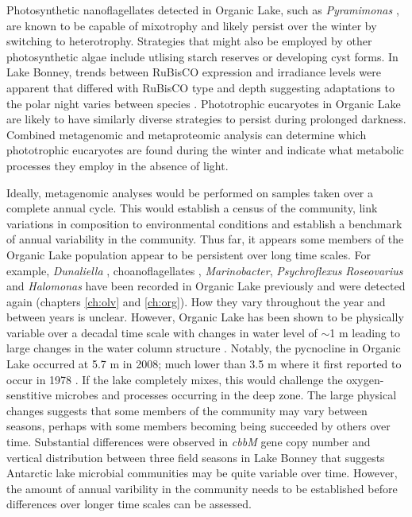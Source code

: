 Photosynthetic nanoflagellates detected in Organic Lake, such as \emph{Pyramimonas} \cite{Bell2003}, are known to be capable of mixotrophy and likely persist over the winter by switching to heterotrophy.
Strategies that might also be employed by other photosynthetic algae include utlising starch reserves or developing cyst forms.
In Lake Bonney, trends between \acs{RuBisCO} expression and irradiance levels were apparent that differed with \acs{RuBisCO} type and depth suggesting adaptations to the polar night varies between species \cite{Kong2012a}.
Phototrophic eucaryotes in Organic Lake are likely to have similarly diverse strategies to persist during prolonged darkness.
Combined metagenomic and metaproteomic analysis can determine which phototrophic eucaryotes are found during the winter and indicate what metabolic processes they employ in the absence of light.

Ideally, metagenomic analyses would be performed on samples taken over a complete annual cycle.
This would establish a census of the community, link variations in composition to environmental conditions and establish a benchmark of annual variability in the community.
Thus far, it appears some members of the Organic Lake population appear to be persistent over long time scales.
For example, \emph{Dunaliella} \cite{Franzmann1987b}, choanoflagellates \cite{vandenHoff1986}, \emph{Marinobacter}, \emph{Psychroflexus} \emph{Roseovarius} and \emph{Halomonas} \cite{Bowman2000b} have been recorded in Organic Lake previously and were detected again (chapters \ref{ch:olv} and \ref{ch:org}).
How they vary throughout the year and between years is unclear.
However, Organic Lake has been shown to be physically variable over a decadal time scale with changes in water level of $\sim$1 m leading to large changes in the water column structure \cite{Gibson1995, Gibson1996}.
Notably, the pycnocline in Organic Lake occurred at 5.7 m in 2008; much lower than 3.5 m where it first reported to occur in 1978 \cite{Franzmann1987b}.
If the lake completely mixes, this would challenge the oxygen-senstitive microbes and processes occurring in the deep zone.
The large physical changes suggests that some members of the community may vary between seasons, perhaps with some members becoming being succeeded by others over time.
Substantial differences were observed in \emph{cbbM} gene copy number and vertical distribution between three field seasons in Lake Bonney \cite{Kong2012b} that suggests Antarctic lake microbial communities may be quite variable over time.
However, the amount of annual varibility in the community needs to be established before differences over longer time scales can be assessed.

